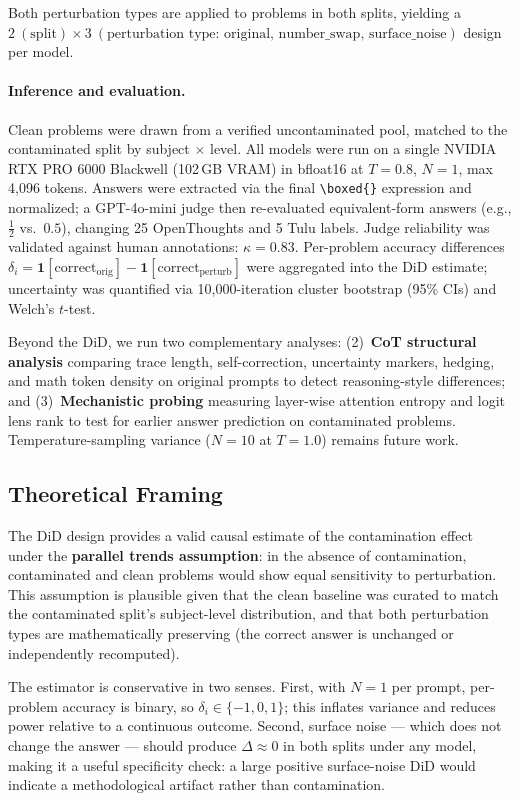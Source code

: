 \documentclass{article} %
\begin{document}
Both perturbation types are applied to problems in both splits, yielding a $2~(\text{split}) \times 3~(\text{perturbation type: original, number\_swap, surface\_noise})$ design per model.

\paragraph{Inference and evaluation.}
Clean problems were drawn from a verified uncontaminated pool, matched to the contaminated split by subject $\times$ level. All models were run on a single NVIDIA RTX PRO 6000 Blackwell (102\,GB VRAM) in bfloat16 at $T{=}0.8$, $N{=}1$, max 4,096 tokens. Answers were extracted via the final \texttt{\textbackslash boxed\{\}} expression and normalized; a GPT-4o-mini judge then re-evaluated equivalent-form answers (e.g., $\tfrac{1}{2}$ vs.\ $0.5$), changing 25 OpenThoughts and 5 Tulu labels. Judge reliability was validated against human annotations: $\kappa = 0.83$. Per-problem accuracy differences $\delta_i = \mathbf{1}[\text{correct}_\text{orig}] - \mathbf{1}[\text{correct}_\text{perturb}]$ were aggregated into the DiD estimate; uncertainty was quantified via 10{,}000-iteration cluster bootstrap (95\% CIs) and Welch's $t$-test.

Beyond the DiD, we run two complementary analyses: (2)~\textbf{CoT structural analysis} comparing trace length, self-correction, uncertainty markers, hedging, and math token density on original prompts to detect reasoning-style differences; and (3)~\textbf{Mechanistic probing} measuring layer-wise attention entropy and logit lens rank to test for earlier answer prediction on contaminated problems. Temperature-sampling variance ($N{=}10$ at $T{=}1.0$) remains future work.

\subsection{Theoretical Framing}

The DiD design provides a valid causal estimate of the contamination effect under the \textbf{parallel trends assumption}: in the absence of contamination, contaminated and clean problems would show equal sensitivity to perturbation. This assumption is plausible given that the clean baseline was curated to match the contaminated split's subject-level distribution, and that both perturbation types are mathematically preserving (the correct answer is unchanged or independently recomputed).

The estimator is conservative in two senses. First, with $N = 1$ per prompt, per-problem accuracy is binary, so $\delta_i \in \{-1, 0, 1\}$; this inflates variance and reduces power relative to a continuous outcome. Second, surface noise --- which does not change the answer --- should produce $\Delta \approx 0$ in both splits under any model, making it a useful specificity check: a large positive surface-noise DiD would indicate a methodological artifact rather than contamination.
\end{document}
